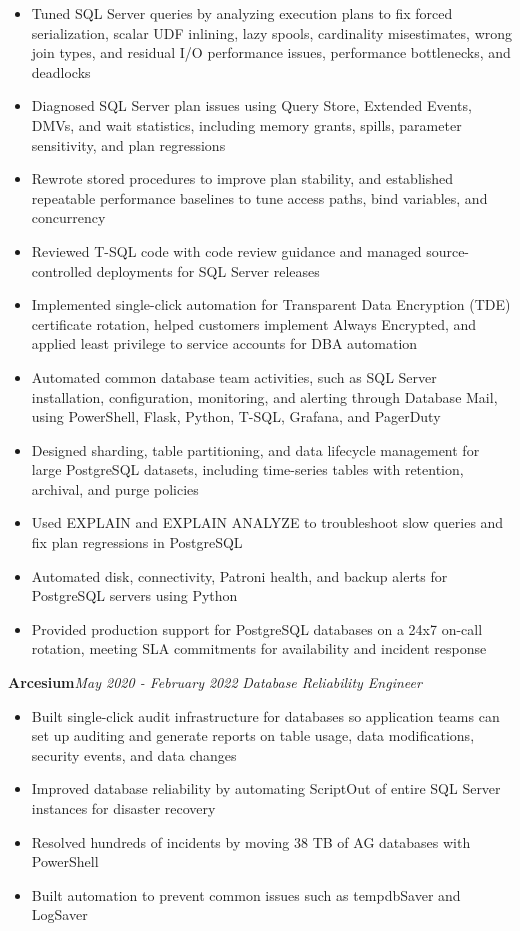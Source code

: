 \documentclass[10pt,a4paper]{article}
\begin{document}
\begin{itemize}
  \item Tuned SQL Server queries by analyzing execution plans to fix forced serialization, scalar UDF inlining, lazy spools, cardinality misestimates, wrong join types, and residual I/O performance issues, performance bottlenecks, and deadlocks
  \item Diagnosed SQL Server plan issues using Query Store, Extended Events, DMVs, and wait statistics, including memory grants, spills, parameter sensitivity, and plan regressions
  \item Rewrote stored procedures to improve plan stability, and established repeatable performance baselines to tune access paths, bind variables, and concurrency
  \item Reviewed T-SQL code with code review guidance and managed source-controlled deployments for SQL Server releases
  \item Implemented single-click automation for Transparent Data Encryption (TDE) certificate rotation, helped customers implement Always Encrypted, and applied least privilege to service accounts for DBA automation
  \item Automated common database team activities, such as SQL Server installation, configuration, monitoring, and alerting through Database Mail, using PowerShell, Flask, Python, T-SQL, Grafana, and PagerDuty
  \item Designed sharding, table partitioning, and data lifecycle management for large PostgreSQL datasets, including time-series tables with retention, archival, and purge policies
  \item Used EXPLAIN and EXPLAIN ANALYZE to troubleshoot slow queries and fix plan regressions in PostgreSQL
  \item Automated disk, connectivity, Patroni health, and backup alerts for PostgreSQL servers using Python
  \item Provided production support for PostgreSQL databases on a 24x7 on-call rotation, meeting SLA commitments for availability and incident response
\end{itemize}
\vspace{14.7pt}
\noindent\textbf{Arcesium}\hfill \textit{May 2020 - February 2022}
\textit{Database Reliability Engineer}\\[-5pt]
\begin{itemize}
  \item Built single-click audit infrastructure for databases so application teams can set up auditing and generate reports on table usage, data modifications, security events, and data changes
  \item Improved database reliability by automating ScriptOut of entire SQL Server instances for disaster recovery
  \item Resolved hundreds of incidents by moving 38 TB of AG databases with PowerShell
  \item Built automation to prevent common issues such as tempdbSaver and LogSaver
\end{itemize}
\end{document}
